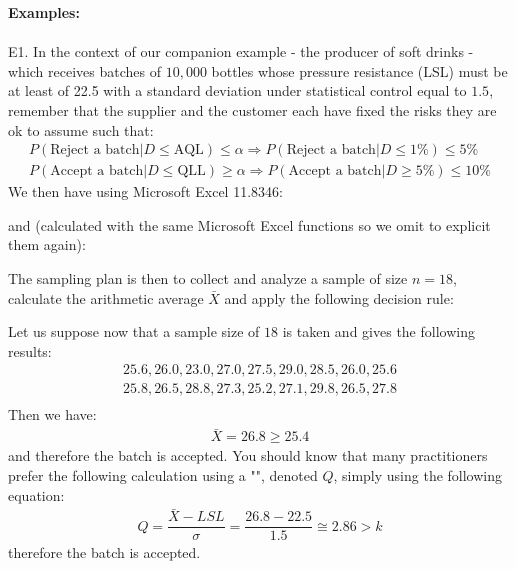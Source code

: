 	\begin{tcolorbox}[colframe=black,colback=white,sharp corners]
	\textbf{{\Large {}}Examples:}\\\\
	E1. In the context of our companion example - the producer of soft drinks - which receives batches of $10,000$ bottles whose pressure resistance (LSL) must be at least of 22.5 with a standard deviation under statistical control equal to $1.5$, remember that the supplier and the customer each have fixed the risks they are ok to assume such that:
	\begin{gather*}
			P(\text{Reject a batch}|D\leq \text{AQL})\leq \alpha\Rightarrow  P(\text{Reject a batch}|D\leq 1\%)\leq 5\%\\
			P(\text{Accept a batch}|D\leq \text{QLL})\geq \alpha\Rightarrow  P(\text{Accept a batch}|D\geq 5\%)\leq 10\%
	\end{gather*}
	We then have using Microsoft Excel 11.8346:
	
	and (calculated with the same Microsoft Excel functions so we omit to explicit them again):
	
	The sampling plan is then to collect and analyze a sample of size $n=18$, calculate the arithmetic average $\bar{X}$ and apply the following decision rule:
	
	Let us suppose now that a sample size of $18$ is taken and gives the following results:
	\begin{gather*}
		25.6, 26.0, 23.0, 27.0, 27.5, 29.0, 28.5, 26.0, 25.6\\
25.8, 26.5, 28.8, 27.3, 25.2, 27.1, 29.8, 26.5, 27.8\\
	\end{gather*}
	Then we have:
	\begin{gather*}
		\bar{X}=26.8\geq 25.4
	\end{gather*}
	and therefore the batch is accepted. You should know that many practitioners prefer the following calculation using a "", denoted $Q$, simply using the following equation:
	\begin{gather*}
		Q=\dfrac{\bar{X}-LSL}{\sigma}=\dfrac{26.8-22.5}{1.5}\cong 2.86>k
	\end{gather*}
	therefore the batch is accepted.
	\end{tcolorbox}
	
